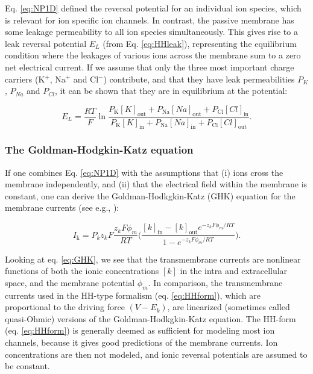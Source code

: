 Eq. \ref{eq:NP1D} defined the reversal potential for an individual ion species, which is relevant for ion specific ion channels. In contrast, the passive membrane has some leakage permeability to all ion species simultaneously. This gives rise to a leak reversal potential $E_L$ (from Eq. \ref{eq:HHleak}), representing the equilibrium condition where the leakages of various ions across the membrane sum to a zero net electrical current.  If we assume that only the three most important charge carriers (K$^{+}$, Na$^{+}$ and Cl$^{-}$) contribute, and that they have leak permeabilities $P_K$, $P_{Na}$ and $P_{Cl}$, it can be shown that they are in equilibrium at the potential:

\begin{equation}
E_L = \frac{R T}{F} 
\ln \frac{P_\text{K} [K]_\text{out}+P_\text{Na} [Na]_\text{out} + P_\text{Cl} [Cl]_\text{in}}
           {P_\text{K} [K]_\text{in}+P_\text{Na} [Na]_\text{in} + P_\text{Cl} [Cl]_\text{out}}.
\label{eq:Eleak_GHK}
\end{equation}


\subsubsection{The Goldman-Hodgkin-Katz equation}
If one combines Eq. \ref{eq:NP1D} with the assumptions that (i) ions cross the membrane independently, and (ii) that the electrical field within the membrane is constant, one can derive the Goldman-Hodkgkin-Katz (GHK) equation for the membrane currents (see e.g., \cite{hodgkin1949, johnston1994foundations}):

\begin{equation}
I_\text{k} = P_k z_k F \frac{z_k F \phi_m}{R T} \Big( \frac{[k]_\text{in}-[k]_\text{out} e^{-z_k F \phi_m/RT}} {1-e^{-z_k F \phi_m/RT}} \Big).
\label{eq:GHK}
\end{equation}

Looking at eq. \ref{eq:GHK}, we see that the transmembrane currents are nonlinear functions of both the ionic concentrations $[k]$ in the intra and extracellular space, and the membrane potential $\phi_m$. In comparison, the transmembrane currents used in the HH-type formalism (eq. \ref{eq:HHform}), which are proportional to the driving force $(V-E_k)$, are linearized (sometimes called quasi-Ohmic) versions of the Goldman-Hodkgkin-Katz equation. The HH-form (eq. \ref{eq:HHform}) is generally deemed as sufficient for modeling most ion channels, because it gives good predictions of the membrane currents. Ion concentrations are then not modeled, and ionic reversal potentials are assumed to be constant. 

